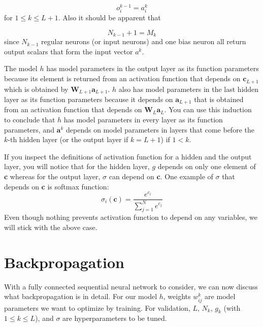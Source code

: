 \documentclass[letterpaper, 11pt]{article}
\newcommand{\w}{w^{k}_{ij}}
\numberwithin{equation}{section}
\numberwithin{figure}{section}
\numberwithin{table}{section}
\begin{document}
\begin{equation}
	o^{k-1}_{i} = a^{k}_{i}
\end{equation}
for \(1 \le k \le L+1\). Also it should be apparent that

\begin{equation}
	N_{k-1} + 1 = M_{k}\label{eq1.7}
\end{equation}
since \(N_{k-1}\) regular neurons (or input neurons) and one bias neuron all return output scalars that form the input vector \(a^{k}\).

The model \(h\) has model parameters in the output layer as its function parameters because its element is returned from an activation function that depends on \(\textbf{c}_{L+1}\) which is obtained by \(\textbf{W}_{L+1}\textbf{a}_{L+1}\). \(h\) also has model parameters in the last hidden layer as its function parameters because it depends on \(\textbf{a}_{L+1}\) that is obtained from an activation function that depends on \(\textbf{W}_{L}\textbf{a}_{L}\). You can use this induction to conclude that \(h\) has model parameters in every layer as its function parameters, and \(\textbf{a}^{k}\) depends on model parameters in layers that come before the \(k\)-th hidden layer (or the output layer if \(k = L+1\)) if \(1 < k\). 

If you inspect the definitions of activation function for a hidden and the output layer, you will notice that for the hidden layer, \(g\) depends on only one element of \textbf{c} whereas for the output layer, \(\sigma\) can depend on \textbf{c}. One example of \(\sigma\) that depends on \textbf{c} is softmax function:
\begin{equation}
	\sigma_{i}(\textbf{c}) = \frac{e^{c_{i}}}{\sum\limits^{N}_{j=1} e^{c_{j}}}  
\end{equation}
Even though nothing prevents activation function to depend on any variables, we will stick with the above case.

\clearpage
\section{Backpropagation}
With a fully connected sequential neural network to consider, we can now discuss what backpropagation is in detail. For our model \(h\), weights \(\w\) are model parameters we want to optimize by training. For validation, \(L\), \(N_{k}\), \(g_{k}\) (with \(1 \le k \le L\)), and \(\sigma\) are hyperparameters to be tuned.

\end{document}
